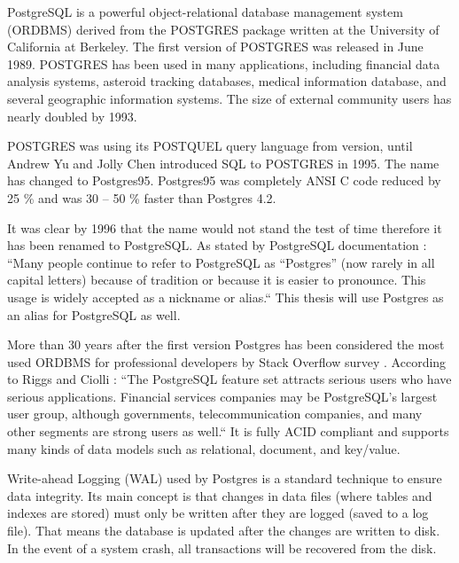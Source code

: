 PostgreSQL is a powerful object-relational database management system (ORDBMS) derived from the POSTGRES package written at the University of California at Berkeley. \cite{docuPgwhatIsPg} \cite{pg14introduction} The first version of POSTGRES was released in June 1989. POSTGRES has been used in many applications, including financial data analysis systems, asteroid tracking databases, medical information database, and several geographic information systems. The size of external community users has nearly doubled by 1993. \cite{docuPgBriefHistory}

POSTGRES was using its POSTQUEL query language from version, until Andrew Yu and Jolly Chen introduced SQL to POSTGRES in 1995. The name has changed to Postgres95. Postgres95 was completely ANSI C code reduced by 25 \% and was 30 – 50 \% faster than Postgres 4.2.  \cite{docuPgBriefHistory}

It was clear by 1996 that the name would not stand the test of time therefore it has been renamed to PostgreSQL. As stated by PostgreSQL documentation \cite{docuPgBriefHistory}: “Many people continue to refer to PostgreSQL as “Postgres” (now rarely in all capital letters) because of tradition or because it is easier to pronounce. This usage is widely accepted as a nickname or alias.“ This thesis will use Postgres as an alias for PostgreSQL as well.

More than 30 years after the first version Postgres has been considered the most used ORDBMS for professional developers by Stack Overflow survey \cite{so2022survey}. According to Riggs and Ciolli \cite{pg14introduction}: “The PostgreSQL feature set attracts serious users who have serious applications. Financial services companies may be PostgreSQL's largest user group, although governments, telecommunication companies, and many other segments are strong users as well.“ It is fully ACID compliant \cite{juba2015learningTransactionIsolation} and supports many kinds of data models such as relational, document, and key/value. \cite{pg14introduction}



Write-ahead Logging (WAL) used by Postgres is a standard technique to ensure data integrity. Its main concept is that changes in data files (where tables and indexes are stored) must only be written after they are logged (saved to a log file). That means the database is updated after the changes are written to disk. In the event of a system crash, all transactions will be recovered from the disk. \cite{docuPgWal}

